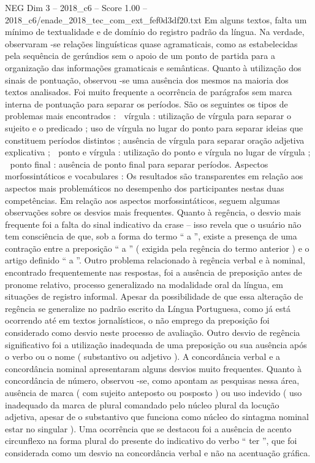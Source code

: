 \begin{textsample}{NEG Dim 3 – 2018\_c6 – Score 1.00 – 2018\_c6/enade\_2018\_tec\_com\_ext\_fef0d3df20.txt}
Em alguns textos, falta um mínimo de textualidade e de domínio do registro padrão da língua.
Na verdade, observaram -se relações linguísticas quase agramaticais, como as estabelecidas pela sequência de gerúndios sem o apoio de um ponto de partida para a organização das informações gramaticais e semânticas.
Quanto à utilização dos sinais de pontuação, observou -se uma ausência dos mesmos na maioria dos textos analisados.
Foi muito frequente a ocorrência de parágrafos sem marca interna de pontuação para separar os períodos.
São os seguintes os tipos de problemas mais encontrados :  vírgula : utilização de vírgula para separar o sujeito e o predicado ; uso de vírgula no lugar do ponto para separar ideias que constituem períodos distintos ; ausência de vírgula para separar oração adjetiva explicativa ;  ponto e vírgula : utilização do ponto e vírgula no lugar de vírgula ;  ponto final : ausência de ponto final para separar períodos.
Aspectos morfossintáticos e vocabulares : Os resultados são transparentes em relação aos aspectos mais problemáticos no desempenho dos participantes nestas duas competências.
Em relação aos aspectos morfossintáticos, seguem algumas observações sobre os desvios mais frequentes.
Quanto à regência, o desvio mais frequente foi a falta do sinal indicativo da crase – isso revela que o usuário não tem consciência de que, sob a forma do termo “ a ”, existe a presença de uma contração entre a preposição “ a ” ( exigida pela regência do termo anterior ) e o artigo definido “ a ”.
Outro problema relacionado à regência verbal e à nominal, encontrado frequentemente nas respostas, foi a ausência de preposição antes de pronome relativo, processo generalizado na modalidade oral da língua, em situações de registro informal.
Apesar da possibilidade de que essa alteração de regência se generalize no padrão escrito da Língua Portuguesa, como já está ocorrendo até em textos jornalísticos, o não emprego da preposição foi considerado como desvio neste processo de avaliação.
Outro desvio de regência significativo foi a utilização inadequada de uma preposição ou sua ausência após o verbo ou o nome ( substantivo ou adjetivo ).
A concordância verbal e a concordância nominal apresentaram alguns desvios muito frequentes.
Quanto à concordância de número, observou -se, como apontam as pesquisas nessa área, ausência de marca ( com sujeito anteposto ou posposto ) ou uso indevido ( uso inadequado da marca de plural comandado pelo núcleo plural da locução adjetiva, apesar de o substantivo que funciona como núcleo do sintagma nominal estar no singular ).
Uma ocorrência que se destacou foi a ausência de acento circunflexo na forma plural do presente do indicativo do verbo “ ter ”, que foi considerada como um desvio na concordância verbal e não na acentuação gráfica.

\end{textsample}
